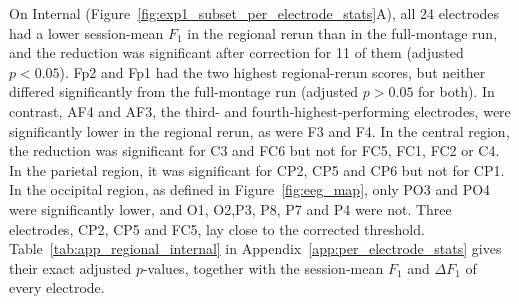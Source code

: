 On Internal (Figure~\ref{fig:exp1_subset_per_electrode_stats}A), all 24 electrodes had a lower session-mean $F_1$ in the regional rerun than in the full-montage run, and the reduction was significant after correction for 11 of them (adjusted $p < 0.05$). Fp2 and Fp1 had the two highest regional-rerun scores, but neither differed significantly from the full-montage run (adjusted $p > 0.05$ for both). In contrast, AF4 and AF3, the third- and fourth-highest-performing electrodes, were significantly lower in the regional rerun, as were F3 and F4. In the central region, the reduction was significant for C3 and FC6 but not for FC5, FC1, FC2 or C4. In the parietal region, it was significant for CP2, CP5 and CP6 but not for CP1. In the occipital region, as defined in Figure~\ref{fig:eeg_map}, only PO3 and PO4 were significantly lower, and O1, O2,P3, P8, P7 and P4 were not. Three electrodes, CP2, CP5 and FC5, lay close to the corrected threshold. Table~\ref{tab:app_regional_internal} in Appendix~\ref{app:per_electrode_stats} gives their exact adjusted $p$-values, together with the session-mean $F_1$ and $\Delta F_1$ of every electrode.
